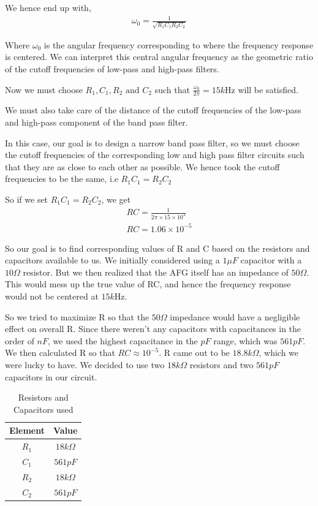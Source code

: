 \documentclass{scrreprt}
\begin{document}
We hence end up with, 
\begin{align}
    \omega _0 = \frac{1}{\sqrt{R_1C_1R_2C_2}}
\end{align}

Where $\omega _0$ is the angular frequency corresponding to where the frequency response is centered. We can interpret this central angular frequency as the geometric ratio of the cutoff frequencies of low-pass and high-pass filters.

Now we must choose $R_1, C_1, R_2 \text{ and }C_2$ such that $\frac{\omega_0}{2\pi} = 15k$Hz will be satisfied. 

We must also take care of the distance of the cutoff frequencies of the low-pass and high-pass component of the band pass filter. 

In this case, our goal is to design a narrow band pass filter, so we must choose the cutoff frequencies of the corresponding low and high pass filter circuits such that they are as close to each other as possible. We hence took the cutoff frequencies to be the same, i.e $R_1C_1 = R_2C_2$

So if we set $R_1C_1 = R_2C_2$, we get 
\begin{align}
    RC = \frac{1}{2\pi \times15 \times 10^3} \\
    RC = 1.06 \times10^{-5}
\end{align}

So our goal is to find corresponding values of R and C based on the resistors and capacitors available to us.
We initially considered using a $1\mu F$ capacitor with a $10\Omega$ resistor. But we then realized that the AFG itself has an impedance of $50\Omega$. This would mess up the true value of RC, and hence the frequency response would not be centered at $15k$Hz. 

So we tried to maximize R so that the $50 \Omega$ impedance would have a negligible effect on overall R. Since there weren't any capacitors with capacitances in the order of $nF$, we used the highest capacitance in the $pF$ range, which was $561pF$. We then calculated R so that $RC \approx 10^{-5}$. R came out to be $18.8 k\Omega$, which we were lucky to have. We decided to use two $18k\Omega$ resistors and two $561 pF$ capacitors in our circuit.

\begin{table}[H]
    \centering
    \begin{tabular}{|c|c|}
    \hline
        Element & Value \\
    \hline
        $R_1$ & $18k\Omega$ \\
        $C_1$ & $561pF$ \\
        $R_2$ & $18k\Omega$ \\
        $C_2$ & $561pF$ \\
    \hline
    \end{tabular}
    \caption{Resistors and Capacitors used}
    \label{tab:rescaptable}
\end{table}
\end{document}
